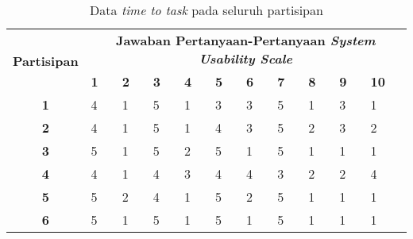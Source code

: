 \begin{table}[h]
    \centering
    \caption{Data \textit{time to task} pada seluruh partisipan}
    \label{system-usability-scale-data}
    \begin{tabularx}{\linewidth}{|c|X|X|X|X|X|X|X|X|X|X|} \hline
        \multirow{2}{*}{\textbf{Partisipan}} & \multicolumn{10}{c|}{\textbf{Jawaban Pertanyaan-Pertanyaan \textit{System Usability Scale}}}\\ \cline{2-11}
        & \textbf{1} & \textbf{2} & \textbf{3} & \textbf{4} & \textbf{5} & \textbf{6} & \textbf{7} & \textbf{8} & \textbf{9} & \textbf{10}\\ \hline
        \textbf{1} & 4 & 1 & 5 & 1 & 3 & 3 & 5 & 1 & 3 & 1\\ \hline
        \textbf{2} & 4 & 1 & 5 & 1 & 4 & 3 & 5 & 2 & 3 & 2\\ \hline
        \textbf{3} & 5 & 1 & 5 & 2 & 5 & 1 & 5 & 1 & 1 & 1\\ \hline
        \textbf{4} & 4 & 1 & 4 & 3 & 4 & 4 & 3 & 2 & 2 & 4\\ \hline
        \textbf{5} & 5 & 2 & 4 & 1 & 5 & 2 & 5 & 1 & 1 & 1\\ \hline
        \textbf{6} & 5 & 1 & 5 & 1 & 5 & 1 & 5 & 1 & 1 & 1\\ \hline
    \end{tabularx}
\end{table}

